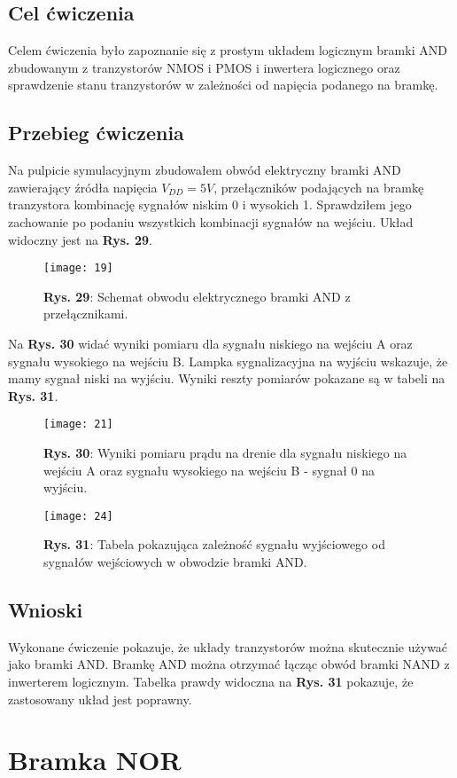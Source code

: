 \documentclass[11pt]{article}
\begin{document}
\subsection{Cel ćwiczenia}
Celem ćwiczenia było zapoznanie się z prostym układem logicznym bramki AND zbudowanym z tranzystorów NMOS i PMOS i inwertera logicznego oraz sprawdzenie stanu tranzystorów w zależności od napięcia podanego na bramkę.
\subsection{Przebieg ćwiczenia}
Na pulpicie symulacyjnym zbudowałem obwód elektryczny bramki AND zawierający źródła napięcia $V_{DD}=5V$, przełączników podających na bramkę tranzystora kombinację sygnałów niskim 0 i wysokich 1. Sprawdziłem jego zachowanie
po podaniu wszystkich kombinacji sygnałów na wejściu. Układ widoczny jest na \textbf{Rys. 29}.
\begin{figure}[H]
\centering
\texttt{[image: 19]}
\caption*{\textbf{Rys. 29}: Schemat obwodu elektrycznego bramki AND z przełącznikami. }
\end{figure}
\noindent Na \textbf{Rys. 30} widać wyniki pomiaru dla sygnału niskiego na wejściu A oraz sygnału wysokiego na wejściu B. Lampka sygnalizacyjna na wyjściu wskazuje, że mamy sygnał niski na wyjściu. Wyniki reszty pomiarów pokazane są w tabeli na \textbf{Rys. 31}.
\begin{figure}[H]
\centering
\texttt{[image: 21]}
\caption*{\textbf{Rys. 30}: Wyniki pomiaru prądu na drenie dla sygnału niskiego na wejściu A oraz sygnału wysokiego na wejściu B - sygnał 0 na wyjściu. }
\end{figure}
\begin{figure}[H]
\centering
\texttt{[image: 24]}
\caption*{\textbf{Rys. 31}: Tabela pokazująca zależność sygnału wyjściowego od sygnałów wejściowych w obwodzie bramki AND.}
\end{figure}
\subsection{Wnioski}
Wykonane ćwiczenie pokazuje, że układy tranzystorów można skutecznie używać jako bramki AND. Bramkę AND można otrzymać łącząc obwód bramki NAND z inwerterem logicznym. Tabelka prawdy widoczna na \textbf{Rys. 31} pokazuje, że zastosowany układ jest poprawny.
\section{Bramka NOR}
\end{document}
